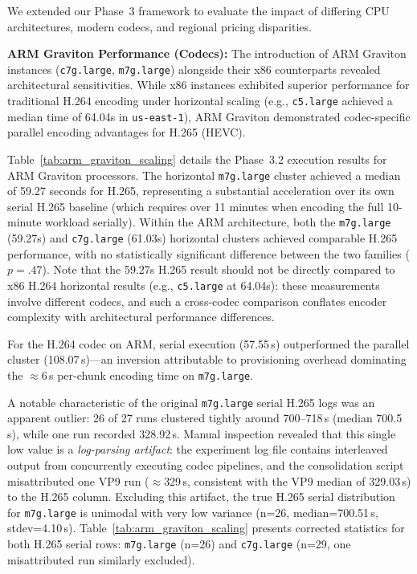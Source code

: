\documentclass[conference]{IEEEtran}
\begin{document}
We extended our Phase~3 framework to evaluate the impact of differing CPU architectures, modern codecs, and regional pricing disparities.

\textbf{ARM Graviton Performance (Codecs):} The introduction of ARM Graviton instances (\texttt{c7g.large}, \texttt{m7g.large}) alongside their x86 counterparts revealed architectural sensitivities. While x86 instances exhibited superior performance for traditional H.264 encoding under horizontal scaling (e.g., \texttt{c5.large} achieved a median time of 64.04s in \texttt{us-east-1}), ARM Graviton demonstrated codec-specific parallel encoding advantages for H.265 (HEVC).

Table~\ref{tab:arm_graviton_scaling} details the Phase~3.2 execution results for ARM Graviton processors. The horizontal \texttt{m7g.large} cluster achieved a median of 59.27 seconds for H.265, representing a substantial acceleration over its own serial H.265 baseline (which requires over 11 minutes when encoding the full 10-minute workload serially). Within the ARM architecture, both the \texttt{m7g.large} (59.27s) and \texttt{c7g.large} (61.03s) horizontal clusters achieved comparable H.265 performance, with no statistically significant difference between the two families ($p = .47$). Note that the 59.27s H.265 result should not be directly compared to x86 H.264 horizontal results (e.g., \texttt{c5.large} at 64.04s): these measurements involve different codecs, and such a cross-codec comparison conflates encoder complexity with architectural performance differences.

For the H.264 codec on ARM, serial execution (57.55\,s) outperformed the parallel cluster (108.07\,s)---an inversion attributable to provisioning overhead dominating the $\approx$6\,s per-chunk encoding time on \texttt{m7g.large}.

A notable characteristic of the original \texttt{m7g.large} serial H.265 logs was an apparent outlier: 26 of 27 runs clustered tightly around 700--718\,s (median 700.5\,s), while one run recorded 328.92\,s. Manual inspection revealed that this single low value is a \textit{log-parsing artifact}: the experiment log file contains interleaved output from concurrently executing codec pipelines, and the consolidation script misattributed one VP9 run ($\approx$329\,s, consistent with the VP9 median of 329.03\,s) to the H.265 column. Excluding this artifact, the true H.265 serial distribution for \texttt{m7g.large} is unimodal with very low variance (n=26, median=700.51\,s, stdev=4.10\,s). Table~\ref{tab:arm_graviton_scaling} presents corrected statistics for both H.265 serial rows: \texttt{m7g.large} (n=26) and \texttt{c7g.large} (n=29, one misattributed run similarly excluded).
\end{document}
